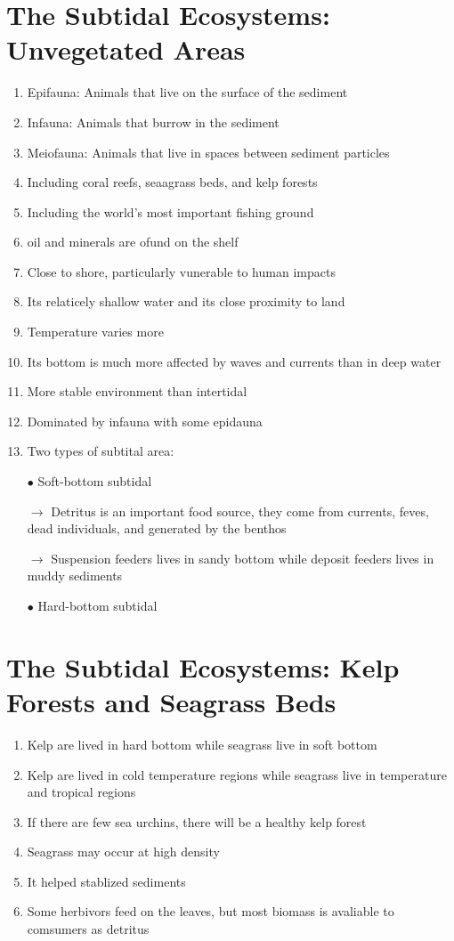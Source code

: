 \documentclass{report}
\begin{document}
\section{The Subtidal Ecosystems: Unvegetated Areas}
\begin{enumerate}
    \item Epifauna: Animals that live on the surface of the sediment
    \item Infauna: Animals that burrow in the sediment
    \item Meiofauna: Animals that live in spaces between sediment particles
    \item Including coral reefs, seaagrass beds, and kelp forests 
    \item Including the world's most important fishing ground 
    \item oil and minerals are ofund on the shelf 
    \item Close to shore, particularly vunerable to human impacts 
    \item Its relaticely shallow water and its close proximity to land 
    \item Temperature varies more
    \item Its bottom is much more affected by waves and currents than in deep water 
    \item More stable environment than intertidal 
    \item Dominated by infauna with some epidauna
    \item Two types of subtital area:
    \item [$\bullet$]Soft-bottom subtidal
    \item [$\rightarrow$]Detritus is an important food source, they come from currents, feves, dead individuals, and generated by the benthos
    \item [$\rightarrow$]Suspension feeders lives in sandy bottom while deposit feeders lives in muddy sediments 
    \item [$\bullet$]Hard-bottom subtidal
\end{enumerate}


\section{The Subtidal Ecosystems: Kelp Forests and Seagrass Beds}
\begin{enumerate}
    \item Kelp are lived in hard bottom while seagrass live in soft bottom 
    \item Kelp are lived in cold temperature regions while seagrass live in temperature and tropical regions 
    \item If there are few sea urchins, there will be a healthy kelp forest
    \item Seagrass may occur at high density
    \item It helped stablized sediments 
    \item Some herbivors feed on the leaves, but most biomass is avaliable to comsumers as detritus 
\end{enumerate}
\end{document}
